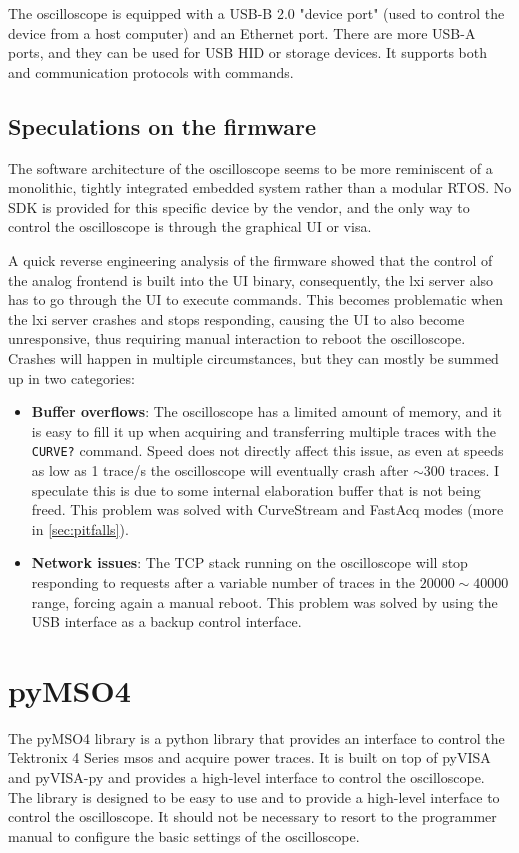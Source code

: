 \documentclass[a4paper,english,twoside,10pt]{article}
\begin{document}
The oscilloscope is equipped with a USB-B 2.0 "device port" (used to control the device from a host computer) and an Ethernet port. There are more USB-A ports, and they can be used for USB HID or storage devices. It supports both  and  communication protocols with  commands.

\subsection{Speculations on the firmware}\label{sec:fw-info}
The software architecture of the oscilloscope seems to be more reminiscent of a monolithic, tightly integrated embedded system rather than a modular RTOS. No SDK is provided for this specific device by the vendor, and the only way to control the oscilloscope is through the graphical UI or \gls{visa}.

A quick reverse engineering analysis of the firmware showed that the control of the analog frontend is built into the UI binary, consequently, the \gls{lxi} server also has to go through the UI to execute commands. This becomes problematic when the \gls{lxi} server crashes and stops responding, causing the UI to also become unresponsive, thus requiring manual interaction to reboot the oscilloscope. Crashes will happen in multiple circumstances, but they can mostly be summed up in two categories:
\begin{itemize}
	\item \textbf{Buffer overflows}: The oscilloscope has a limited amount of memory, and it is easy to fill it up when acquiring and transferring multiple traces with the \texttt{CURVE?} command. Speed does not directly affect this issue, as even at speeds as low as 1 trace/s the oscilloscope will eventually crash after \(\sim 300\) traces. I speculate this is due to some internal elaboration buffer that is not being freed. This problem was solved with CurveStream and FastAcq modes (more in \autoref{sec:pitfalls}).
	\item \textbf{Network issues}: The TCP stack running on the oscilloscope will stop responding to requests after a variable number of traces in the \(20000\sim 40000\) range, forcing again a manual reboot. This problem was solved by using the USB interface as a backup control interface.
\end{itemize}

\section{pyMSO4}
The pyMSO4 library is a python library that provides an interface to control the Tektronix 4 Series \glspl{mso} and acquire power traces. It is built on top of pyVISA and pyVISA-py and provides a high-level interface to control the oscilloscope. The library is designed to be easy to use and to provide a high-level interface to control the oscilloscope. It should not be necessary to resort to the programmer manual to configure the basic settings of the oscilloscope.
\end{document}
